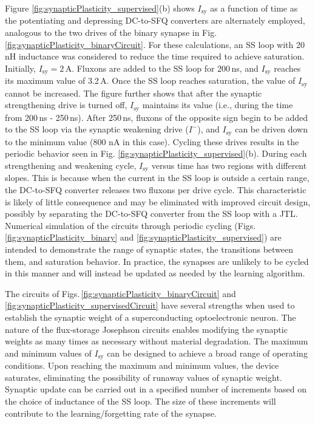 \documentclass[twocolumn]{article}
\begin{document}
Figure \ref{fig:synapticPlasticity_supervised}(b) shows $I_{\mathrm{sy}}$ as a function of time as the potentiating and depressing DC-to-SFQ converters are alternately employed, analogous to the two drives of the binary synapse in Fig. \ref{fig:synapticPlasticity_binaryCircuit}. For these calculations, an SS loop with 20\,nH inductance was considered to reduce the time required to achieve saturation. Initially, $I_{\mathrm{sy}} = 2$\,\textmu A. Fluxons are added to the SS loop for 200\,ns, and $I_{\mathrm{sy}}$ reaches its maximum value of 3.2\,\textmu A. Once the SS loop reaches saturation, the value of $I_{\mathrm{sy}}$ cannot be increased. The figure further shows that after the synaptic strengthening drive is turned off, $I_{\mathrm{sy}}$ maintains its value (i.e., during the time from 200\,ns - 250\,ns). After 250\,ns, fluxons of the opposite sign begin to be added to the SS loop via the synaptic weakening drive ($I^-$), and $I_{\mathrm{sy}}$ can be driven down to the minimum value (800 nA in this case). Cycling these drives results in the periodic behavior seen in Fig. \ref{fig:synapticPlasticity_supervised}(b). During each strengthening and weakening cycle, $I_{\mathrm{sy}}$ versus time has two regions with different slopes. This is because when the current in the SS loop is outside a certain range, the DC-to-SFQ converter releases two fluxons per drive cycle. This characteristic is likely of little consequence and may be eliminated with improved circuit design, possibly by separating the DC-to-SFQ converter from the SS loop with a JTL. Numerical simulation of the circuits through periodic cycling (Figs.\,\ref{fig:synapticPlasticity_binary} and \ref{fig:synapticPlasticity_supervised}) are intended to demonstrate the range of synaptic states, the transitions between them, and saturation behavior. In practice, the synapses are unlikely to be cycled in this manner and will instead be updated as needed by the learning algorithm.

The circuits of Figs.\,\ref{fig:synapticPlasticity_binaryCircuit} and \ref{fig:synapticPlasticity_supervisedCircuit} have several strengths when used to establish the synaptic weight of a superconducting optoelectronic neuron. The nature of the flux-storage Josephson circuits enables modifying the synaptic weights as many times as necessary without material degradation. The maximum and minimum values of $I_{\mathrm{sy}}$ can be designed to achieve a broad range of operating conditions. Upon reaching the maximum and minimum values, the device saturates, eliminating the possibility of runaway values of synaptic weight. Synaptic update can be carried out in a specified number of increments based on the choice of inductance of the SS loop. The size of these increments will contribute to the learning/forgetting rate of the synapse. 
\end{document}
